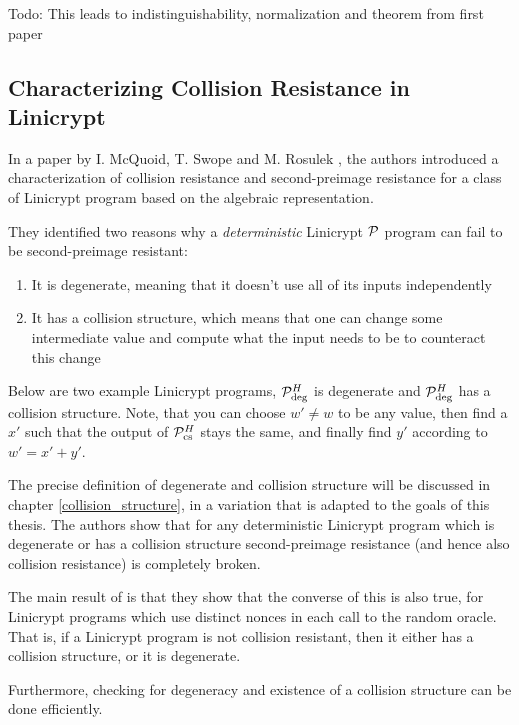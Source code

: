 Todo: This leads to indistinguishability, normalization and theorem from first paper

\subsection{Characterizing Collision Resistance in Linicrypt}

In a paper by I. McQuoid, T. Swope and M. Rosulek
\cite[Characterizing Collision and Second-Preimage Resistance in Linicrypt]{RMS20},
the authors introduced a characterization of collision resistance
and second-preimage resistance for a class of Linicrypt program based on the algebraic representation.

They identified two reasons why a \textit{deterministic} Linicrypt $\P$ program can fail to be second-preimage resistant:
\begin{enumerate}
  \item It is degenerate, meaning that it doesn't use all of its inputs independently
  \item It has a collision structure,
    which means that one can change some intermediate value and compute what the input needs to be to counteract this change
\end{enumerate}

Below are two example Linicrypt programs, $\P^\H_\textrm{deg}$ is degenerate and $\P^\H_\textrm{deg}$ has a collision structure.
Note, that you can choose $w' \neq w$ to be any value,
then find a $x'$ such that the output of $\P^\H_{\textrm{cs}}$ stays the same,
and finally find $y'$ according to $w' = x' + y'$.

\begin{pchstack}[center,space=2cm]
\end{pchstack}

The precise definition of degenerate and collision structure will be discussed in chapter \ref{collision_structure},
in a variation that is adapted to the goals of this thesis.
The authors show that for any deterministic Linicrypt program which is degenerate
or has a collision structure
second-preimage resistance (and hence also collision resistance) is completely broken.

The main result of \cite{C:CarRos16} is that they show that the converse of this is also true,
for Linicrypt programs which use distinct nonces in each call to the random oracle.
That is, if a Linicrypt program is not collision resistant,
then it either has a collision structure, or it is degenerate.

Furthermore, checking for degeneracy and existence of a collision structure can be done efficiently.
